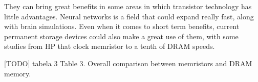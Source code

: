 \documentclass[ecp,tc,english]{iiufrgs}
\begin{document}
They can bring great benefits in some areas in which transistor technology has little advantages. Neural networks is a field that could expand really fast, along with brain simulations. Even when it comes to short term benefits, current permanent storage devices could also make a great use of them, with some studies from HP that clock memristor to a tenth of DRAM speeds.

[TODO] tabela 3
Table 3. Overall comparison between memristors and DRAM memory.



\end{document}
